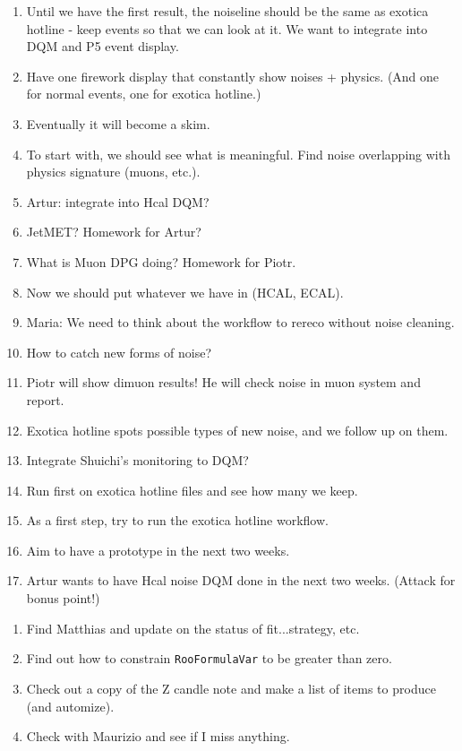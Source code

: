 \begin{enumerate}
\item Until we have the first result, the noiseline should be the same as exotica hotline - keep events so that we can look at it.
We want to integrate into DQM and P5 event display.
\item Have one firework display that constantly show noises + physics.  (And one for normal events, one for exotica hotline.)
\item Eventually it will become a skim.
\item To start with, we should see what is meaningful.  Find noise overlapping with physics signature (muons, etc.).
\item Artur: integrate into Hcal DQM?
\item JetMET?  Homework for Artur?
\item What is Muon DPG doing?  Homework for Piotr.
\item Now we should put whatever we have in (HCAL, ECAL).
\item Maria: We need to think about the workflow to rereco without noise cleaning.
\item How to catch new forms of noise?
\item Piotr will show dimuon results!  He will check noise in muon system and report.
\item Exotica hotline spots possible types of new noise, and we follow up on them.
\item Integrate Shuichi's monitoring to DQM?
\item Run first on exotica hotline files and see how many we keep.
\item As a first step, try to run the exotica hotline workflow.
\item Aim to have a prototype in the next two weeks.
\item Artur wants to have Hcal noise DQM done in the next two weeks.  (Attack for bonus point!)
\end{enumerate}



\begin{enumerate}
\item Find Matthias and update on the status of fit...strategy, etc.
\item Find out how to constrain \texttt{RooFormulaVar} to be greater than zero.
\item Check out a copy of the Z candle note and make a list of items to produce (and automize).
\item Check with Maurizio and see if I miss anything.
\end{enumerate}

